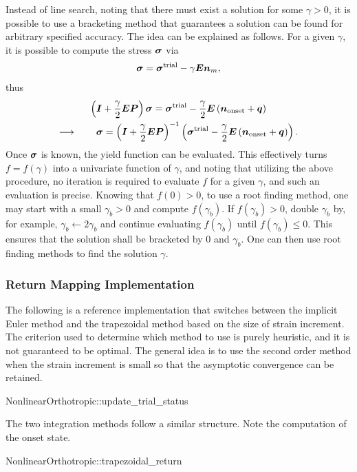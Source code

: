 Instead of line search, noting that there must exist a solution for some $\gamma>0$, it is possible to use a bracketing method that guarantees a solution can be found for arbitrary specified accuracy.
The idea can be explained as follows.
For a given $\gamma$, it is possible to compute the stress $\bm{\sigma}$ via
\begin{gather}
    \bm{\sigma}=\bm{\sigma}^\text{trial}-\gamma\bm{E}\bm{n}_m,
\end{gather}
thus
\begin{multline}
    \left(\bm{I}+\dfrac{\gamma}{2}\bm{E}\bm{P}\right)\bm{\sigma}=\bm{\sigma}^\text{trial}-\dfrac{\gamma}{2}\bm{E}\left(\bm{n}_\text{onset}+\bm{q}\right) \\\longrightarrow\qquad
    \bm{\sigma}=\left(\bm{I}+\dfrac{\gamma}{2}\bm{E}\bm{P}\right)^{-1}\left(\bm{\sigma}^\text{trial}-\dfrac{\gamma}{2}\bm{E}\left(\bm{n}_\text{onset}+\bm{q}\right)\right).
\end{multline}
Once $\bm{\sigma}$ is known, the yield function can be evaluated.
This effectively turns $f=f\left(\gamma\right)$ into a univariate function of $\gamma$, and noting that utilizing the above procedure, no iteration is required to evaluate $f$ for a given $\gamma$, and such an evaluation is precise.
Knowing that $f\left(0\right)>0$, to use a root finding method, one may start with a small $\gamma_b>0$ and compute $f\left(\gamma_b\right)$.
If $f\left(\gamma_b\right)>0$, double $\gamma_b$ by, for example, $\gamma_b\leftarrow2\gamma_b$ and continue evaluating $f\left(\gamma_b\right)$ until $f\left(\gamma_b\right)\leqslant0$.
This ensures that the solution shall be bracketed by $0$ and $\gamma_b$.
One can then use root finding methods to find the solution $\gamma$.
\subsubsection{Return Mapping Implementation}
The following is a reference implementation that switches between the implicit Euler method and the trapezoidal method based on the size of strain increment.
The criterion used to determine which method to use is purely heuristic, and it is not guaranteed to be optimal.
The general idea is to use the second order method when the strain increment is small so that the asymptotic convergence can be retained.
\begin{cppcode}
NonlinearOrthotropic::update_trial_status
\end{cppcode}

The two integration methods follow a similar structure.
Note the computation of the onset state.
\begin{cppcode}
NonlinearOrthotropic::trapezoidal_return
\end{cppcode}


